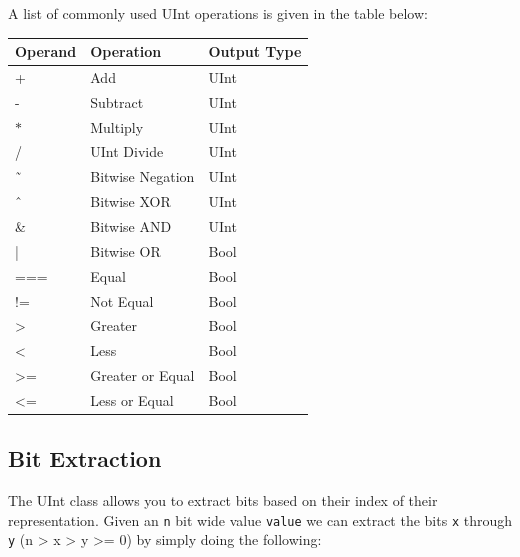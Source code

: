 A list of commonly used UInt operations is given in the table below:

\begin{center}
\begin{tabular}{| l | l | l | }
\hline
{\bf Operand} & {\bf Operation} & {\bf Output Type} \\ \hline
+ & Add & UInt  \\ \hline
- & Subtract & UInt  \\ \hline
$\ast$ & Multiply & UInt \\ \hline
/ & UInt Divide & UInt \\ \hline
\~\ & Bitwise Negation & UInt \\ \hline
\^\ & Bitwise XOR & UInt\\ \hline
\& & Bitwise AND & UInt \\ \hline
 | & Bitwise OR & Bool \\ \hline
=== & Equal & Bool \\ \hline
!= & Not Equal & Bool \\ \hline
> & Greater & Bool \\ \hline
< & Less & Bool \\ \hline
>= & Greater or Equal & Bool \\ \hline
<= & Less or Equal & Bool \\ \hline
\end{tabular}
\end{center}

% 
% 

\subsection{Bit Extraction}

The UInt class allows you to extract bits based on their index of their representation. Given an \verb+n+ bit wide value \verb+value+ we can extract the bits \verb+x+ through \verb+y+ (n > x > y >= 0) by simply doing the following:

